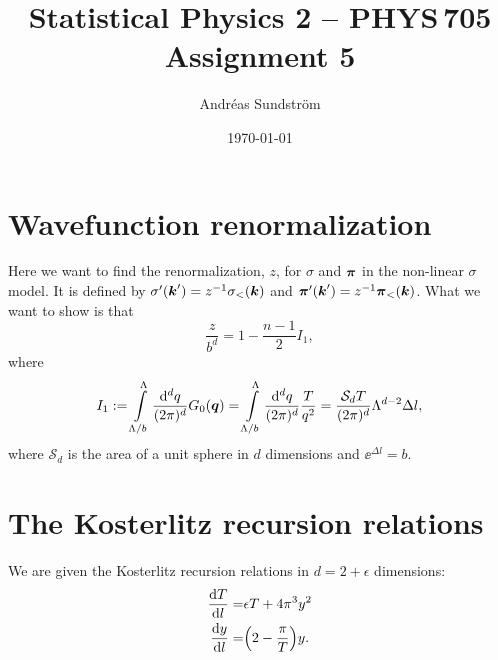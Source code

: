 \documentclass[11pt,letter, swedish, english
]{article}
\begin{document}




\title{Statistical Physics 2 -- PHYS\,705 \\
Assignment 5}
\author{Andréas Sundström}
\date{\today}

\maketitle


\section{Wavefunction renormalization}
Here we want to find the renormalization, $z$, for $\sigma$ and
$\vb*\pi$ in the non-linear $\sigma$ model. It is defined by 
$\sigma'(\vb*k') = z^{-1}\sigma_<(\vb*k)$ and
$\vb*\pi'(\vb*k') = z^{-1}\vb*\pi_<(\vb*k)$. What we want to show is
that
\begin{equation}\label{eq:1_want}
\frac{z}{b^{d}} = 1 -\frac{n-1}{2}I_1,
\end{equation}
where
\begin{equation}
I_1:= \int_{\Lambda/b}^\Lambda \frac{\rd^dq}{(2\pi)^d}G_0(\vb*q)
= \int_{\Lambda/b}^\Lambda \frac{\rd^dq}{(2\pi)^d} \frac{T}{q^2}
= \frac{\mathcal{S}_d T}{(2\pi)^d} \Lambda^{d-2} \Delta{l},
\end{equation}
where $\mathcal{S}_d$ is the area of a unit sphere in $d$ dimensions
and $\ee^{\Delta{l}} = b$.


\section{The Kosterlitz recursion relations}

We are given the Kosterlitz recursion relations in $d=2+\epsilon$
dimensions:
\begin{align}
\label{eq:2_dT/dl}
\dv{T}{l} =& \epsilon T +4\pi^3y^2\\
\label{eq:2_dy/dl}
\dv{y}{l} =& \qty(2 -\frac{\pi}{T})y.
\end{align}
\end{document}
